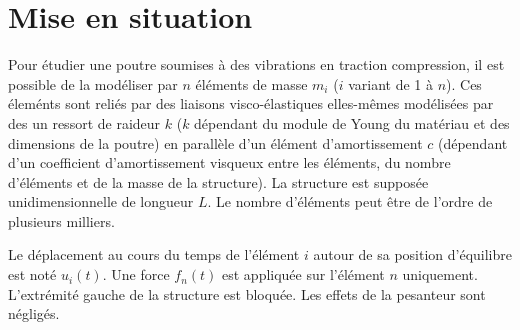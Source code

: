 \documentclass[10pt]{article}
\newif\ifxp
\begin{document}
\ifxp

\else

\fi



 \renewcommand{\baselinestretch}{1.2}
\setlength{\parskip}{2ex plus 0.5ex minus 0.2ex}



\section{Mise en situation}

\begin{minipage}[c]{.7\linewidth}
Pour étudier une poutre soumises à des vibrations en traction compression, il est possible de la modéliser par $n$ éléments de masse $m_i$ ($i$ variant de 1 à $n$). Ces éleménts sont reliés par des liaisons visco-élastiques elles-mêmes modélisées par des un ressort de raideur $k$ ($k$ dépendant du module de Young du matériau et des dimensions de la poutre) en parallèle d'un élément d'amortissement $c$ (dépendant d'un coefficient d'amortissement visqueux entre les éléments, du nombre d'éléments et de la masse de la structure). La structure est supposée unidimensionnelle de longueur $L$. Le nombre d'éléments peut être de l'ordre de plusieurs milliers. 

Le déplacement au cours du temps de l'élément $i$ autour de sa position d'équilibre est noté $u_i(t)$. Une force $f_n(t)$ est appliquée sur l'élément $n$ uniquement. L'extrémité gauche de
la structure est bloquée. Les effets de la pesanteur sont négligés.
\end{minipage}
\begin{minipage}[c]{.27\linewidth}
\begin{center}
\end{center}
\end{minipage}

\begin{center}
\end{center}



\begin{minipage}[c]{.77\linewidth}


\begin{obj}

\end{obj}
\end{minipage} \hfill
\begin{minipage}[c]{.2\linewidth}

\end{minipage}
\end{document}
